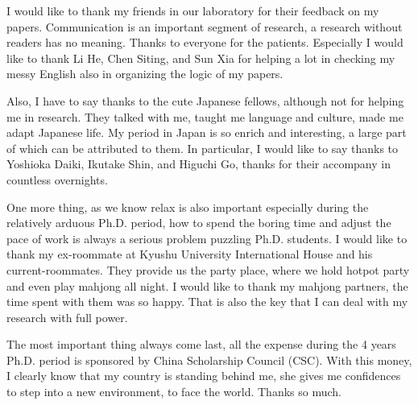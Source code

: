 \documentclass[12pt, twoside, a4paper]{book} %
\begin{document}
I would like to thank my friends in our laboratory for their feedback on my papers. Communication is an important segment of research, a research without readers has no meaning. Thanks to everyone for the patients. Especially I would like to thank Li He, Chen Siting, and Sun Xia for helping a lot in checking my messy English also in organizing the logic of my papers. 

Also, I have to say thanks to the cute Japanese fellows, although not for helping me in research. They talked with me, taught me language and culture, made me adapt Japanese life. My period in Japan is so enrich and interesting, a large part of which can be attributed to them. In particular, I would like to say thanks to Yoshioka Daiki, Ikutake Shin, and Higuchi Go, thanks for their accompany in countless overnights.

One more thing, as we know relax is also important especially during the relatively arduous Ph.D. period, how to spend the boring time and adjust the pace of work is always a serious problem puzzling Ph.D. students. I would like to thank my ex-roommate at Kyushu University International House and his current-roommates. They provide us the party place, where we hold hotpot party and even play mahjong all night. I would like to thank my mahjong partners, the time spent with them was so happy. That is also the key that I can deal with my research with full power.

The most important thing always come last, all the expense during the 4 years Ph.D. period is sponsored by China Scholarship Council (CSC). With this money, I clearly know that my country is standing behind me, she gives me confidences to step into a new environment, to face the world. Thanks so much.

\end{document}
